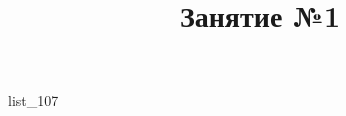 \documentclass[12pt, a4paper]{article}
\begin{document}
	\title{Занятие №1}
	{list_107}
\end{document}
